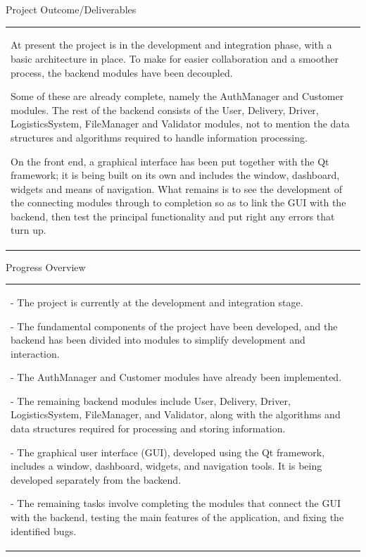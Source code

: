 \documentclass[12pt,a4paper]{article}
\newcommand{\sectiontitle}[1]{%
    {\color{GEUBlue}
    \fontsize{18}{22}\selectfont #1}
}
\newcommand{\instruction}[1]{%
    {\color{InstructionGrey}
    \fontsize{10.5}{13}\selectfont #1}
}
\newcommand{\answerbox}[2]{%
    \begin{tabularx}{\textwidth}{
        |>{\raggedright\arraybackslash}X|}
        \hline
        \parbox[t][#1][t]{\dimexpr\linewidth-12pt\relax}{
            \vspace{5pt}
            \fontsize{11}{13}\selectfont #2
        }\\
        \hline
    \end{tabularx}
}
\begin{document}

\vspace*{0.30cm}
\newpage
\sectiontitle{Project Outcome/Deliverables }

\vspace{0.05cm}

\instruction{

}

\vspace{0.35cm}

\answerbox{5.35cm}{At present the project is in the development and integration phase, with a basic architecture in place. To make for easier collaboration and a smoother process, the backend modules have been decoupled.

Some of these are already complete, namely the AuthManager and Customer modules. The rest of the backend consists of the User, Delivery, Driver, LogisticsSystem, FileManager and Validator modules, not to mention the data structures and algorithms required to handle information processing.

On the front end, a graphical interface has been put together with the Qt framework; it is being built on its own and includes the window, dashboard, widgets and means of navigation. What remains is to see the development of the connecting modules through to completion so as to link the GUI with the backend, then test the principal functionality and put right any errors that turn up.}

\vspace{0.75cm}

\sectiontitle{Progress Overview }

\vspace{0.05cm}

\instruction{
}

\vspace{0.25cm}

\answerbox{5.45cm}{- The project is currently at the development and integration stage.

- The fundamental components of the project have been developed, and the backend has been divided into modules to simplify development and interaction.

- The AuthManager and Customer modules have already been implemented.

- The remaining backend modules include User, Delivery, Driver, LogisticsSystem, FileManager, and Validator, along with the algorithms and data structures required for processing and storing information.

- The graphical user interface (GUI), developed using the Qt framework, includes a window, dashboard, widgets, and navigation tools. It is being developed separately from the backend.

- The remaining tasks involve completing the modules that connect the GUI with the backend, testing the main features of the application, and fixing the identified bugs.}
\end{document}

